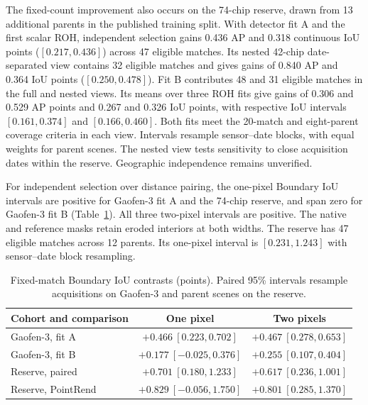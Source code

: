 \documentclass[journal]{IEEEtran}
\begin{document}
The fixed-count improvement also occurs on the 74-chip reserve, drawn from 13 additional parents in the published training split. With detector fit A and the first scalar ROH, independent selection gains 0.436 AP and 0.318 continuous IoU points (\([0.217,0.436]\)) across 47 eligible matches. Its nested 42-chip date-separated view contains 32 eligible matches and gives gains of 0.840 AP and 0.364 IoU points (\([0.250,0.478]\)). Fit B contributes 48 and 31 eligible matches in the full and nested views. Its means over three ROH fits give gains of 0.306 and 0.529 AP points and 0.267 and 0.326 IoU points, with respective IoU intervals \([0.161,0.374]\) and \([0.166,0.460]\). Both fits meet the 20-match and eight-parent coverage criteria in each view. Intervals resample sensor--date blocks, with equal weights for parent scenes. The nested view tests sensitivity to close acquisition dates within the reserve. Geographic independence remains unverified.

For independent selection over distance pairing, the one-pixel Boundary IoU intervals are positive for Gaofen-3 fit A and the 74-chip reserve, and span zero for Gaofen-3 fit B (Table~\ref{tab:native-boundary}). All three two-pixel intervals are positive. The native and reference masks retain eroded interiors at both widths. The reserve has 47 eligible matches across 12 parents. Its one-pixel interval is \([0.231,1.243]\) with sensor--date block resampling.

\begin{table}[t]
\centering
\caption{Fixed-match Boundary IoU contrasts (points). Paired 95\% intervals resample acquisitions on Gaofen-3 and parent scenes on the reserve.}
\label{tab:native-boundary}
\footnotesize
\setlength{\tabcolsep}{2.5pt}
\begin{tabular}{@{}lcc@{}}
\toprule
Cohort and comparison & One pixel & Two pixels\\
\midrule
Gaofen-3, fit A & \(+0.466\ [0.223,0.702]\) & \(+0.467\ [0.278,0.653]\)\\
Gaofen-3, fit B & \(+0.177\ [-0.025,0.376]\) & \(+0.255\ [0.107,0.404]\)\\
Reserve, paired & \(+0.701\ [0.180,1.233]\) & \(+0.617\ [0.236,1.001]\)\\
Reserve, PointRend & \(+0.829\ [-0.056,1.750]\) & \(+0.801\ [0.285,1.370]\)\\
\bottomrule
\end{tabular}
\end{table}
\end{document}
